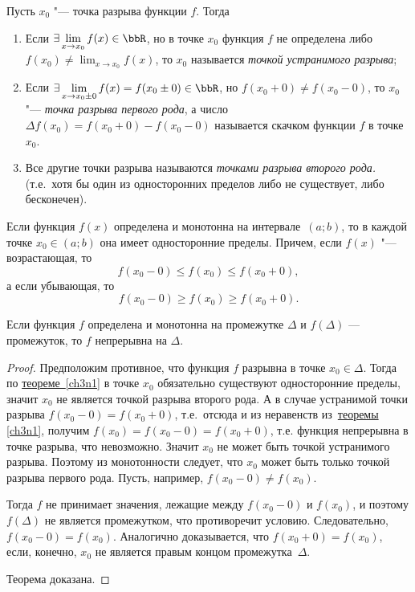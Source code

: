 \begin{defn}
Пусть $x_0$ "--- точка разрыва функции $f$. Тогда 
\begin{enumerate}[wide, labelwidth=!, labelindent=0pt]
\item
Если $\exists \lim_{x \to x_0}\limits f(x) \in \bbR$, но в точке $x_0$ функция $f$ не определена либо $f(x_0)\ne \lim_{x\to x_0} f(x)$, то $x_0$ называется \textit{точкой устранимого разрыва};

\vspace*{\baselineskip}
\item
Если $\exists \lim_{x \to x_0\pm0}\limits f(x)=f(x_0\pm 0) \in \bbR$, но $f(x_0+0)\ne f(x_0-0)$, то $x_0$ "--- \textit{точка разрыва первого рода}, а число $\Delta f(x_0)=f(x_0+0)-f(x_0-0)$ называется скачком функции $f$ в точке $x_0$.

\vspace*{\baselineskip}
\item
Все другие точки разрыва называются \textit{точками разрыва второго рода.} (т.е.~хотя бы один из односторонних пределов либо не существует, либо бесконечен).
\end{enumerate}
\end{defn}
\begin{thm} \label{ch3n1} 
Если функция $f(x)$ определена и монотонна на интервале~$(a;b)$, то в каждой точке $x_0\in(a;b)$ она имеет односторонние пределы. Причем, если $f(x)$ "--- возрастающая, то 
$$
f(x_0-0)\le f(x_0)\le f(x_0+0),
$$
а если убывающая, то
$$
f(x_0-0)\ge f(x_0)\ge f(x_0+0).
$$
\end{thm}
\begin{thm} \label{ch3n3} 
Если функция $f$ определена и монотонна на промежутке $\Delta$ и $f(\Delta)$ — промежуток, то $f$ непрерывна на $\Delta$.
\end{thm}
\begin{proof}
Предположим противное, что функция $f$ разрывна в точке $x_0 \in\Delta$. Тогда по \hyperref[ch3n1]{теореме~\ref{ch3n1}} в точке $x_0$ обязательно существуют односторонние пределы, значит $x_0$ не является точкой разрыва второго рода.  А в случае устранимой точки разрыва $f(x_0-0)=f(x_0+0)$, т.е.~отсюда и из неравенств из~\hyperref[ch3n1]{теоремы \ref{ch3n1}}, получим $f(x_0)=f(x_0-0)=f(x_0+0)$, т.е. функция непрерывна в точке разрыва, что невозможно. Значит $x_0$ не может быть точкой устранимого разрыва. Поэтому из монотонности следует, что $x_0$ может быть только точкой разрыва первого рода. Пусть, например, $f(x_0-0)\ne f(x_0)$.

Тогда $f$ не принимает значения, лежащие между $f(x_0 - 0)$ и $f(x_0)$, и поэтому $f(\Delta)$ не является промежутком, что противоречит условию. Следовательно, $f(x_0-0) = f(x_0)$. Аналогично доказывается, что  $f(x_0 + 0) = f(x_0)$, если, конечно, $x_0$ не является правым концом промежутка~$\Delta$. 

Теорема доказана.
\end{proof} 
